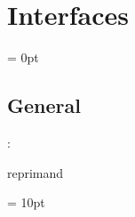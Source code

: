 
\section{Interfaces} 


\parskip = 0pt

\vspace{3mm} \subsection*{General}

: 

reprimand
\vspace{2mm}

\vspace{5mm}\parskip = 10pt 
